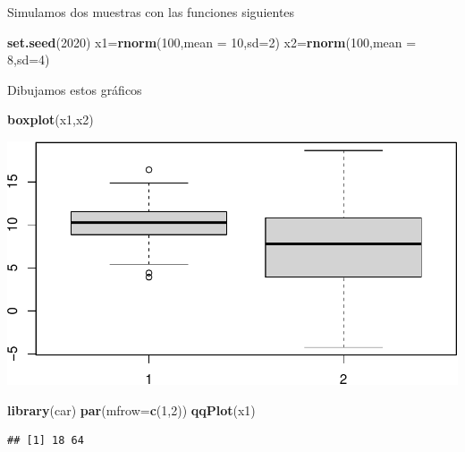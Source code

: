\documentclass[
]{article}
\newenvironment{Shaded}{\begin{snugshade}}{\end{snugshade}}
\newcommand{\DataTypeTok}[1]{\textcolor[rgb]{0.13,0.29,0.53}{#1}}
\newcommand{\DecValTok}[1]{\textcolor[rgb]{0.00,0.00,0.81}{#1}}
\newcommand{\KeywordTok}[1]{\textcolor[rgb]{0.13,0.29,0.53}{\textbf{#1}}}
\newcommand{\NormalTok}[1]{#1}
\begin{document}
Simulamos dos muestras con las funciones siguientes

\begin{Shaded}
\begin{Highlighting}[]
\KeywordTok{set.seed}\NormalTok{(}\DecValTok{2020}\NormalTok{)}
\NormalTok{x1=}\KeywordTok{rnorm}\NormalTok{(}\DecValTok{100}\NormalTok{,}\DataTypeTok{mean =} \DecValTok{10}\NormalTok{,}\DataTypeTok{sd=}\DecValTok{2}\NormalTok{)}
\NormalTok{x2=}\KeywordTok{rnorm}\NormalTok{(}\DecValTok{100}\NormalTok{,}\DataTypeTok{mean =} \DecValTok{8}\NormalTok{,}\DataTypeTok{sd=}\DecValTok{4}\NormalTok{)}
\end{Highlighting}
\end{Shaded}

Dibujamos estos gráficos

\begin{Shaded}
\begin{Highlighting}[]
\KeywordTok{boxplot}\NormalTok{(x1,x2)}
\end{Highlighting}
\end{Shaded}

\includegraphics{taller_problemas_resueltos_extra_1_files/figure-latex/unnamed-chunk-8-1.pdf}

\begin{Shaded}
\begin{Highlighting}[]
\KeywordTok{library}\NormalTok{(car)}
\KeywordTok{par}\NormalTok{(}\DataTypeTok{mfrow=}\KeywordTok{c}\NormalTok{(}\DecValTok{1}\NormalTok{,}\DecValTok{2}\NormalTok{))}
\KeywordTok{qqPlot}\NormalTok{(x1)}
\end{Highlighting}
\end{Shaded}

\begin{verbatim}
## [1] 18 64
\end{verbatim}
\end{document}
